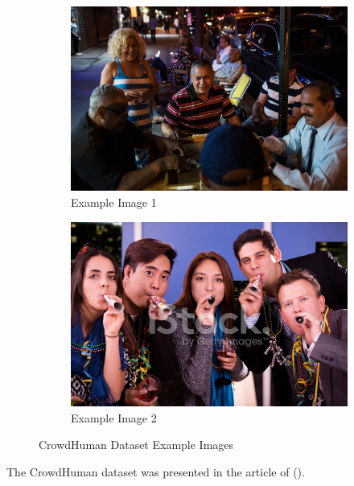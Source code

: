 \begin{figure}[H]
    \centering
    \begin{subfigure}{0.49\textwidth}
        \centering
        \includegraphics[width=\textwidth]{Images/External_datasets/CrowdHuman_1.jpg}
        \caption{\centering Example Image 1}
    \end{subfigure}
    \hfill
    \begin{subfigure}{0.49\textwidth}
        \centering
        \includegraphics[width=\textwidth]{Images/External_datasets/CrowdHuman_2.jpg}
        \caption{\centering Example Image 2}
    \end{subfigure}
    \caption{\centering CrowdHuman Dataset Example Images}
    \label{fig:CrowdHuman_examples}
\end{figure}


The CrowdHuman dataset was presented in the article of \citeauthor{shao2018crowdhuman} (\citeyear{shao2018crowdhuman}).

